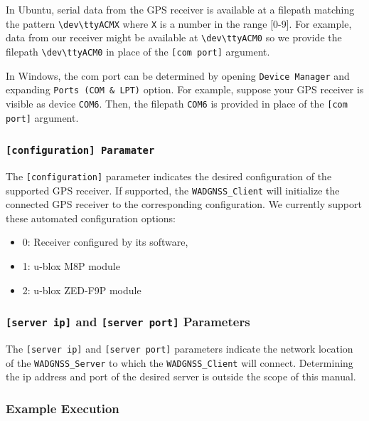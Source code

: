 In Ubuntu, serial data from the GPS receiver is available at a filepath matching the pattern \texttt{\textbackslash dev\textbackslash ttyACMX} where \texttt{X} is a number in the range [0-9]. For example, data from our receiver might be available at \texttt{\textbackslash dev\textbackslash ttyACM0} so we provide the filepath \texttt{\textbackslash dev\textbackslash ttyACM0} in place of the \texttt{[com port]} argument.

In Windows, the com port can be determined by opening \texttt{Device Manager} and expanding \texttt{Ports (COM \& LPT)} option. For example, suppose your GPS receiver is visible as device \texttt{COM6}. Then, the filepath \texttt{COM6} is provided in place of the \texttt{[com port]} argument.

\subsubsection{\texttt{[configuration] Paramater}}
The \texttt{[configuration]} parameter indicates the desired configuration of the supported GPS receiver. If supported, the \texttt{WADGNSS\_Client} will initialize the connected GPS receiver to the corresponding configuration. We currently support these automated configuration options:
\begin{itemize}
\item 0: Receiver configured by its software,
\item 1: u-blox M8P module
\item 2: u-blox ZED-F9P module
\end{itemize}

\subsubsection{\texttt{[server ip]} and \texttt{[server port]} Parameters}
The \texttt{[server ip]} and \texttt{[server port]} parameters indicate the network location of the  \texttt{WADGNSS\_Server} to which the \texttt{WADGNSS\_Client} will connect. 
\green
Determining the ip address and port of the desired server is outside the scope of this manual.
\black

\subsubsection{Example Execution}

